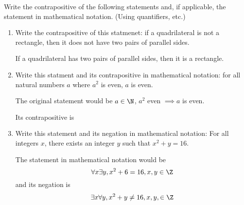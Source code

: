\question 
Write the contrapositive of the following statements and, 
if applicable, the statement in mathematical notation. 
(Using quantifiers, etc.)

\begin{enumerate}[label=\alph*]
\item Write the contrapositive of this statmenet: if a quadrilateral is not a rectangle, then it does not have two 
pairs of parallel sides.
\begin{solution}[2in]
If a quadrilateral has two pairs of parallel sides, then it is a rectangle.
\end{solution}
\item Write this statment and its contrapositive in mathematical notation: for all natural numbers $a$ where $a^2$ is even, $a$ is even.
\begin{solution}[2in] 
The original statement would be 
$a \in \N$, $a^2$ even $\implies a$ is even. 

Its contrapositive is 
\end{solution}
\item Write this statement and its negation in mathematical notation: For all integers $x$, there exists an integer $y$ such that $x^2 + y = 16$.
\begin{solution}
The statement in mathematical notation would be 
$$\forall x \exists y, x^2+6 = 16, x,y\in\Z$$
and its negation is
$$\exists x  \forall y, x^2 + y \neq 16, x,y, \in \Z$$
\end{solution}
\end{enumerate}

\clearpage

